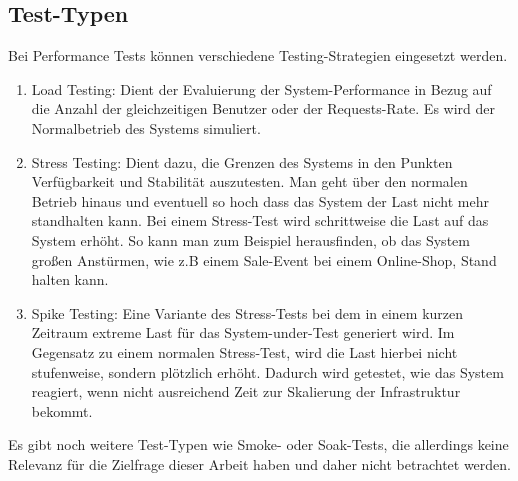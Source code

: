 \subsection{Test-Typen}
Bei Performance Tests können verschiedene Testing-Strategien eingesetzt werden.
\begin{enumerate}
    \item Load Testing: Dient der Evaluierung der System-Performance in Bezug auf die Anzahl der gleichzeitigen Benutzer oder der Requests-Rate. Es wird der Normalbetrieb des Systems simuliert.
    
    \item Stress Testing: Dient dazu, die Grenzen des Systems in den Punkten Verfügbarkeit und  Stabilität auszutesten. Man geht über den normalen Betrieb hinaus und eventuell so hoch dass das System der Last nicht mehr standhalten kann. Bei einem Stress-Test wird schrittweise die Last auf das System erhöht. So kann man zum Beispiel herausfinden, ob das System großen Anstürmen, wie z.B einem Sale-Event bei einem Online-Shop, Stand halten kann.
    
    \item Spike Testing: Eine Variante des Stress-Tests bei dem in einem kurzen Zeitraum extreme Last für das System-under-Test generiert wird. Im Gegensatz zu einem normalen Stress-Test, wird die Last hierbei nicht stufenweise, sondern plötzlich erhöht. Dadurch wird getestet, wie das System reagiert, wenn nicht ausreichend Zeit zur Skalierung der Infrastruktur bekommt.
\end{enumerate}

Es gibt noch weitere Test-Typen wie Smoke- oder Soak-Tests, die allerdings keine Relevanz für die Zielfrage dieser Arbeit haben und daher nicht betrachtet werden.

